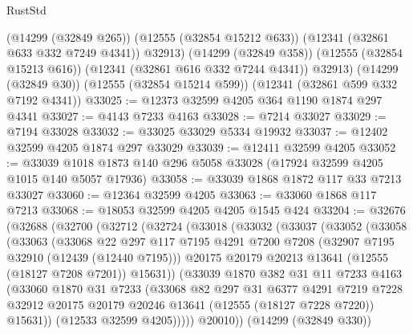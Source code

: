 \begin{lexlean}{RustStd}
\begin{coremodule}
        (@14299 (@32849 @265))
        (@12555 (@32854 @15212 @633))
        (@12341 (@32861 @633 @332 @7249 @4341))
        @32913)
      (@14299 (@32849 @358))
      (@12555 (@32854 @15213 @616))
      (@12341 (@32861 @616 @332 @7244 @4341))
      @32913)
    (@14299 (@32849 @30))
    (@12555 (@32854 @15214 @599))
    (@12341 (@32861 @599 @332 @7192 @4341))
@33025 := @12373 @32599 @4205 @364 @1190 @1874 @297 @4341
@33027 := @4143 @7233 @4163
@33028 := @7214 @33027
@33029 := @7194 @33028
@33032 := @33025 @33029 @5334 @19932
@33037 := @12402 @32599 @4205 @1874 @297 @33029
@33039 := @12411 @32599 @4205
@33052 := @33039 @1018 @1873 @140 @296 @5058 @33028 (@17924 @32599 @4205 @1015 @140 @5057 @17936)
@33058 := @33039 @1868 @1872 @117 @33 @7213 @33027
@33060 := @12364 @32599 @4205
@33063 := @33060 @1868 @117 @7213
@33068 := @18053 @32599 @4205 @4205 @1545 @424
@33204 := @32676
    (@32688
      (@32700
        (@32712
          (@32724
            (@33018
              (@33032
                (@33037
                  (@33052
                    (@33058
                      (@33063
                        (@33068
                          @22
                          @297
                          @117
                          @7195
                          @4291
                          @7200
                          @7208
                          (@32907 @7195 @32910 (@12439 (@12440 @7195)))
                          @20175
                          @20179
                          @20213
                          @13641
                          (@12555 (@18127 @7208 @7201))
                          @15631))
                      (@33039
                        @1870
                        @382
                        @31
                        @11
                        @7233
                        @4163
                        (@33060
                          @1870
                          @31
                          @7233
                          (@33068
                            @82
                            @297
                            @31
                            @6377
                            @4291
                            @7219
                            @7228
                            @32912
                            @20175
                            @20179
                            @20246
                            @13641
                            (@12555 (@18127 @7228 @7220))
                            @15631))
                        (@12533 @32599 @4205)))))
                @20010))
            (@14299 (@32849 @330))

\end{coremodule}
\end{lexlean}
